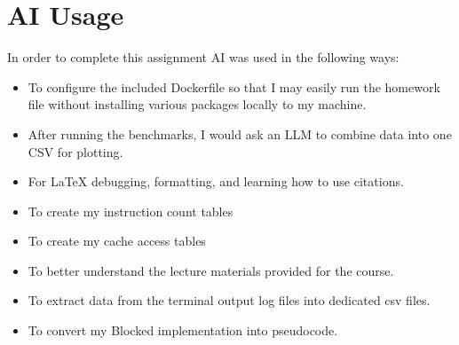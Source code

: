 \section{AI Usage}

In order to complete this assignment AI was used in the following ways:

\begin{itemize}
    \item To configure the included Dockerfile so that I may easily run the homework file without installing various packages locally to my machine.
    \item After running the benchmarks, I would ask an LLM to combine data into one CSV for plotting.
    \item For LaTeX debugging, formatting, and learning how to use citations.
    \item To create my instruction count tables
    \item To create my cache access tables
    \item To better understand the lecture materials provided for the course.
    \item To extract data from the terminal output log files into dedicated csv files.
    \item To convert my Blocked implementation into pseudocode.
\end{itemize}